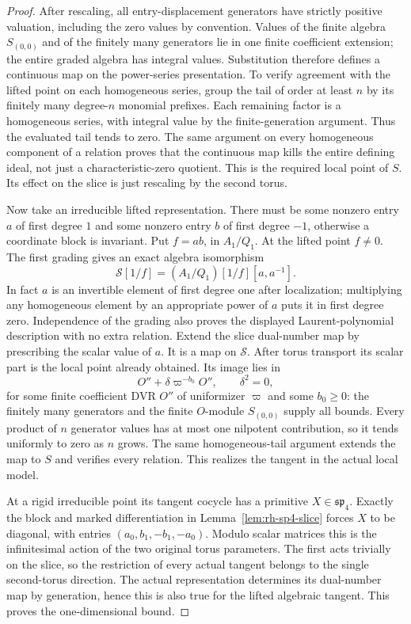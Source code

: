 \begin{proof}
After rescaling, all entry-displacement generators
have strictly positive valuation, including the zero
values by convention. Values of the finite algebra
\(S_{(0,0)}\) and of the finitely many generators lie
in one finite coefficient extension; the entire
graded algebra has integral values. Substitution
therefore defines a continuous map on the power-series
presentation. To verify agreement with the lifted
point on each homogeneous series, group the tail
of order at least \(n\) by its finitely many
degree-\(n\) monomial prefixes. Each remaining
factor is a homogeneous series, with integral
value by the finite-generation argument.
Thus the evaluated tail tends to zero.
The same argument on every homogeneous component
of a relation proves that the continuous map kills
the entire defining ideal, not just a characteristic-zero
quotient. This is the required local point of \(S\).
Its effect on the slice is just rescaling by the
second torus.

Now take an irreducible lifted representation.
There must be some nonzero entry \(a\) of first
degree \(1\) and some nonzero entry \(b\) of first
degree \(-1\), otherwise a coordinate block is
invariant. Put \(f=ab\), in \(A_1/Q_1\).
At the lifted point \(f\ne0\).
The first grading gives an exact algebra isomorphism
\[
       \mathscr S[1/f]=(A_1/Q_1)[1/f][a,a^{-1}].
\]
In fact \(a\) is an invertible element of first degree
one after localization; multiplying any homogeneous
element by an appropriate power of \(a\) puts it
in first degree zero. Independence of the grading
also proves the displayed Laurent-polynomial
description with no extra relation.
Extend the slice dual-number map by prescribing
the scalar value of \(a\). It is a map on \(\mathscr S\).
After torus transport its scalar part is the
local point already obtained. Its image lies in
\[
 O''+\delta\varpi^{-b_0}O'',\qquad \delta^2=0,
\]
for some finite coefficient DVR \(O''\) of uniformizer
\(\varpi\) and some \(b_0\ge0\): the finitely many
generators and the finite \(O\)-module \(S_{(0,0)}\)
supply all bounds. Every product of \(n\) generator
values has at most one nilpotent contribution, so
it tends uniformly to zero as \(n\) grows.
The same homogeneous-tail argument extends the
map to \(S\) and verifies every relation.
This realizes the tangent in the actual local model.

At a rigid irreducible point its tangent cocycle
has a primitive \(X\in\mathfrak{sp}_4\). Exactly the
block and marked differentiation in
Lemma~\ref{lem:rh-sp4-slice} forces \(X\) to be
diagonal, with entries \((a_0,b_1,-b_1,-a_0)\).
Modulo scalar matrices this is the infinitesimal
action of the two original torus parameters.
The first acts trivially on the slice, so the
restriction of every actual tangent belongs to
the single second-torus direction.
The actual representation determines its dual-number
map by generation, hence this is also true for
the lifted algebraic tangent. This proves the
one-dimensional bound.


\end{proof}
